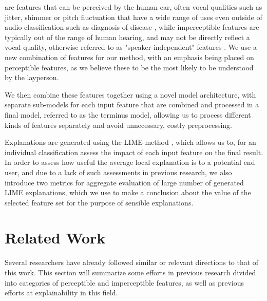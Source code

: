 \documentclass{article}
\begin{document}
	are features that can be perceived by the human ear, often vocal qualities such as jitter,
	shimmer or pitch fluctuation that have a wide range of uses even outside of audio
	classification such as diagnosis of disease \cite{chaiwongyen_deepfake-speech_2023}, while
	imperceptible features are typically out of the range of human hearing, and may not be
	directly reflect a vocal quality, otherwise referred to as "speaker-independent" features
	\cite{liu_hidden--wave_2023}. We use a new combination of features for our method, with an
	emphasis being placed on perceptible features, as we believe these to be the most likely to be
	understood by the layperson.
	\par
	We then combine these features together using a novel model architecture, with separate
	sub-models for each input feature that are combined and processed in a final model, referred
	to as the terminus model, allowing us to process different kinds of features separately and
	avoid unnecessary, costly preprocessing.
	\par
	Explanations are generated using the LIME method \cite{ribeiro_why_2016}, which allows us to,
	for an individual classification assess the impact of each input feature on the final result.
	In order to assess how useful the average local explanation is to a potential end user, and
	due to a lack of such assessments in previous research, we also introduce two metrics for
	aggregate evaluation of large number of generated LIME explanations, which we use to make a
	conclusion about the value of the selected feature set for the purpose of sensible
	explanations.
	\section{Related Work}
	Several researchers have already followed similar or relevant directions to that of this work.
	This section will summarize some efforts in previous research divided into categories of
	perceptible and imperceptible features, as well as previous efforts at explainability in this
	field.
\end{document}

